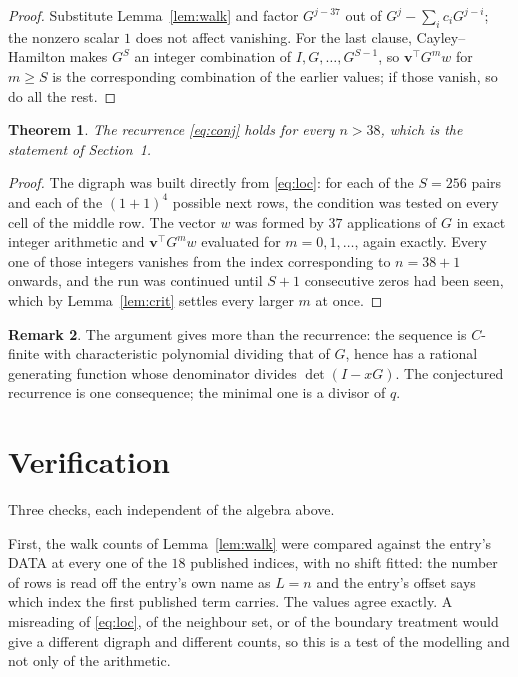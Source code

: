 \documentclass[11pt,a4paper]{article}
\theoremstyle{plain}
\newtheorem{theorem}{Theorem}
\theoremstyle{definition}
\newtheorem{remark}[theorem]{Remark}
\begin{document}
\begin{proof}
Substitute Lemma~\ref{lem:walk} and factor $G^{j-37}$ out of
$G^{j}-\sum_ic_iG^{j-i}$; the nonzero scalar $1$ does not affect
vanishing. For the last clause, Cayley--Hamilton makes $G^{S}$ an integer combination of
$I,G,\dots,G^{S-1}$, so $\mathbf{v}^{\!\top}G^{m}w$ for $m\ge S$ is the corresponding
combination of the earlier values; if those vanish, so do all the rest.
\end{proof}

\begin{theorem}
The recurrence \eqref{eq:conj} holds for every $n>38$, which is the statement of
Section~1.
\end{theorem}

\begin{proof}
The digraph was built directly from \eqref{eq:loc}: for each of the $S=256$ pairs and each
of the $(1+1)^{4}$ possible next rows, the condition was tested on every cell of
the middle row. The vector $w$ was formed by $37$ applications of $G$ in exact integer
arithmetic and $\mathbf{v}^{\!\top}G^{m}w$ evaluated for $m=0,1,\dots$, again exactly.
Every one of those integers vanishes from the index corresponding to $n=38+1$ onwards,
and the run was continued until $S+1$ consecutive zeros had been seen, which by
Lemma~\ref{lem:crit} settles every larger $m$ at once.
\end{proof}

\begin{remark}
The argument gives more than the recurrence: the sequence is $C$-finite with characteristic
polynomial dividing that of $G$, hence has a rational generating function whose denominator
divides $\det(I-xG)$. The conjectured recurrence is one consequence; the minimal one is a
divisor of $q$.
\end{remark}

\section{Verification}

Three checks, each independent of the algebra above.

First, the walk counts of Lemma~\ref{lem:walk} were compared against the entry's DATA at
every one of the $18$ published indices, with no shift fitted: the number of rows is
read off the entry's own name as $L=n$ and the entry's offset says which index the first
published term carries. The values agree exactly. A misreading of \eqref{eq:loc}, of the
neighbour set, or of the boundary treatment would give a different digraph and different
counts, so this is a test of the modelling and not only of the arithmetic.
\end{document}
